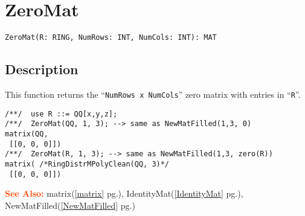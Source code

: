 \documentclass[a4paper]{mybook}
\newenvironment{command}{}{} %
\newcommand\SeeAlso{\par\textcolor{OrangeRed}{\textbf{\large See Also: }}}
\begin{document}
\section{ZeroMat}
\label{ZeroMat}
\begin{command} %


\begin{Verbatim}[label=syntax, rulecolor=\color{MidnightBlue},
frame=single]
ZeroMat(R: RING, NumRows: INT, NumCols: INT): MAT
\end{Verbatim}


\subsection*{Description}

This function returns the ``\verb&NumRows x NumCols&'' zero matrix
with entries in ``\verb&R&''.
\begin{Verbatim}[label=example, rulecolor=\color{PineGreen}, frame=single]
/**/  use R ::= QQ[x,y,z];
/**/  ZeroMat(QQ, 1, 3); --> same as NewMatFilled(1,3, 0)
matrix(QQ,
 [[0, 0, 0]])
/**/  ZeroMat(R, 1, 3); --> same as NewMatFilled(1,3, zero(R))
matrix( /*RingDistrMPolyClean(QQ, 3)*/
 [[0, 0, 0]])
\end{Verbatim}


\SeeAlso %
  matrix(\ref{matrix} pg.\pageref{matrix}), 
    IdentityMat(\ref{IdentityMat} pg.\pageref{IdentityMat}), 
    NewMatFilled(\ref{NewMatFilled} pg.\pageref{NewMatFilled})
\end{command} %
\end{document}
